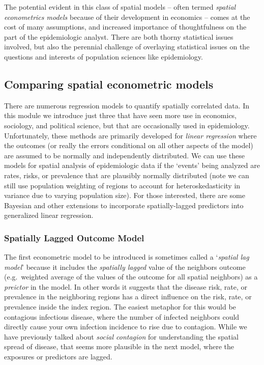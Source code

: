 \documentclass[
]{book}
\begin{document}
The potential evident in this class of spatial models -- often termed \emph{spatial econometrics models} because of their development in economics -- comes at the cost of many assumptions, and increased importance of thoughtfulness on the part of the epidemiologic analyst. There are both thorny statistical issues involved, but also the perennial challenge of overlaying statistical issues on the questions and interests of population sciences like epidemiology.

\hypertarget{comparing-spatial-econometric-models}{%
\subsection{Comparing spatial econometric models}\label{comparing-spatial-econometric-models}}

There are numerous regression models to quantify spatially correlated data. In this module we introduce just three that have seen more use in economics, sociology, and political science, but that are occasionally used in epidemiology. Unfortunately, these methods are primarily developed for \emph{linear regression} where the outcomes (or really the errors conditional on all other aspects of the model) are assumed to be normally and independently distributed. We can use these models for spatial analysis of epidemiologic data if the `events' being analyzed are rates, risks, or prevalence that are plausibly normally distributed (note we can still use population weighting of regions to account for heteroskedasticity in variance due to varying population size). For those interested, there are some Bayesian and other extensions to incorporate spatially-lagged predictors into generalized linear regression.

\hypertarget{spatially-lagged-outcome-model}{%
\subsubsection{Spatially Lagged Outcome Model}\label{spatially-lagged-outcome-model}}

The first econometric model to be introduced is sometimes called a `\emph{spatial lag model}' because it includes the \emph{spatially lagged} value of the neighbors outcome (e.g.~weighted average of the values of the outcome for all spatial neighbors) as a \emph{preictor} in the model. In other words it suggests that the disease risk, rate, or prevalence in the neighboring regions has a direct influence on the risk, rate, or prevalence inside the index region. The easiest metaphor for this would be contagious infectious disease, where the number of infected neighbors could directly cause your own infection incidence to rise due to contagion. While we have previously talked about \emph{social contagion} for understanding the spatial spread of disease, that seems more plausible in the next model, where the exposures or predictors are lagged.
\end{document}
